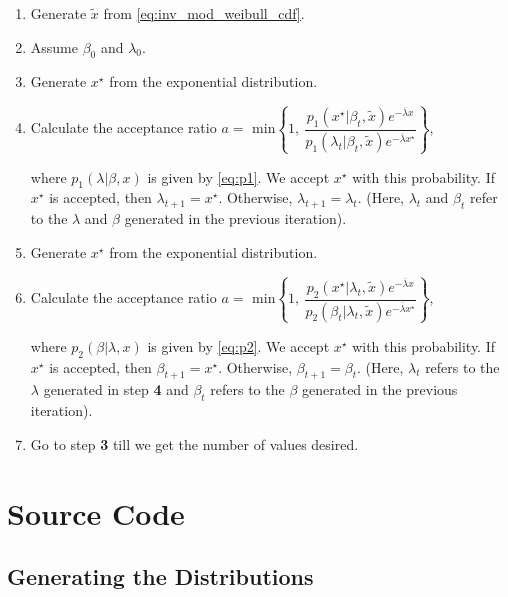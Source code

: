 \documentclass[11pt]{article}
\numberwithin{equation}{section}
\begin{document}
\begin{enumerate}
	\item Generate $\widetilde{x}$ from \eqref{eq:inv_mod_weibull_cdf}. \medskip

	\item Assume $\beta_0$ and $\lambda_0$. \medskip

	\item Generate $x^\star$ from the exponential distribution. \medskip

	\item Calculate the acceptance ratio $a = $ min$\left\lbrace1,\: \dfrac{p_1\left(x^\star | \beta_t, \widetilde{x} \right) e^{-\overline{\lambda} x}}{p_1\left(\lambda_t | \beta_t, \widetilde{x} \right) e^{-\overline{\lambda} x^\star}}\right\rbrace$, \medskip

			where $p_1\left(\lambda | \beta, x\right)$ is given by \eqref{eq:p1}. We accept $x^\star$ with this probability. If $x^\star$ is accepted, then $\lambda_{t+1} = x^\star$. Otherwise, $\lambda_{t+1} = \lambda_t$. (Here, $\lambda_t$ and $\beta_t$ refer to the $\lambda$ and $\beta$ generated in the previous iteration). \medskip

	\item Generate $x^\star$ from the exponential distribution. \medskip

	\item Calculate the acceptance ratio $a = $ min$\left\lbrace1,\: \dfrac{p_2\left(x^\star | \lambda_t, \widetilde{x}\right) e^{-\overline{\lambda} x}}{p_2\left(\beta_t | \lambda_t, \widetilde{x}\right) e^{-\overline{\lambda} x^\star}}\right\rbrace$, \medskip

			where $p_2\left(\beta | \lambda, x\right)$ is given by \eqref{eq:p2}. We accept $x^\star$ with this probability. If $x^\star$ is accepted, then $\beta_{t+1} = x^\star$. Otherwise, $\beta_{t+1} = \beta_t$. (Here, $\lambda_t$ refers to the $\lambda$ generated in step \textbf{4} and $\beta_t$ refers to the $\beta$ generated in the previous iteration). \medskip

	\item Go to step \textbf{3} till we get the number of values desired.
\end{enumerate}

\pagebreak

\section{Source Code}
\subsection{Generating the Distributions}
\medskip
\end{document}
